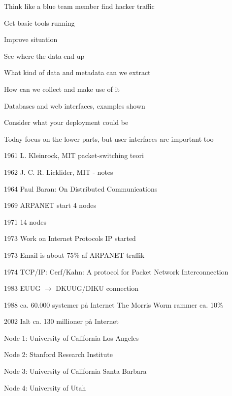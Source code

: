 \documentclass[Screen16to9,17pt]{foils}
\begin{document}

\begin{list1}
\item Think like a blue team member find hacker traffic
\item Get basic tools running
\item Improve situation
\begin{list2}
\item See where the data end up
\item What kind of data and metadata can we extract
\item How can we collect and make use of it
\item Databases and web interfaces, examples shown
\item Consider what your deployment could be
\end{list2}
\end{list1}

\centerline{Today focus on the lower parts, but user interfaces are important too}


\begin{list2}
\item[1961]  L. Kleinrock, MIT packet-switching teori
\item[1962]  J. C. R. Licklider, MIT - notes
\item[1964]  Paul Baran: On Distributed Communications
\item[1969]  ARPANET start 4 nodes
\item[1971]  14 nodes
\item[1973]  Work on Internet Protocols IP started
\item[1973]  Email is about 75\% af ARPANET traffik
\item[1974]  TCP/IP: Cerf/Kahn: A protocol for Packet
        Network Interconnection
\item[1983]  EUUG $\rightarrow$ DKUUG/DIKU connection
\item[1988]  ca. 60.000 systemer på Internet
        The Morris Worm rammer ca. 10\%
\item[2002]  Ialt ca. 130 millioner på Internet
\end{list2}


\begin{list2}
\item Node 1: University of California Los Angeles
\item Node 2: Stanford Research Institute
\item Node 3: University of California Santa Barbara
\item Node 4: University of Utah
\end{list2}
\end{document}
